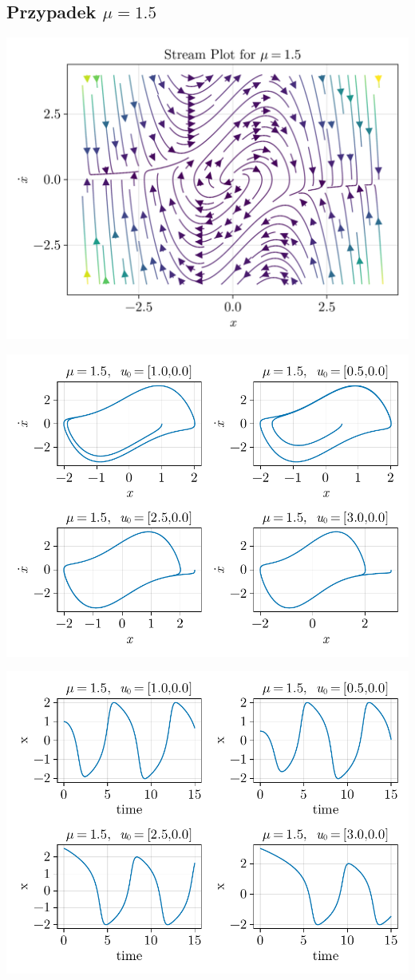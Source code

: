 \clearpage

%
%
\subsection{Przypadek $\mu = 1.5$}
\includegraphics[width=\textwidth]{out/stream_08.png}

\includegraphics[width=\textwidth]{out/phase_08.pdf}

\includegraphics[width=\textwidth]{out/xfromt_08.pdf}

